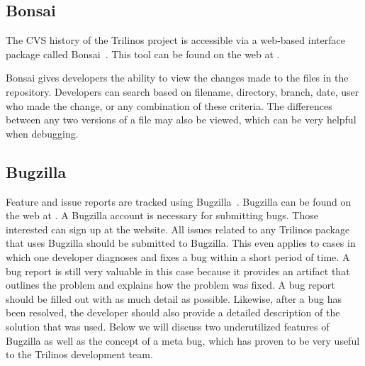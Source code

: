 \documentclass[12pt,relax]{TrilinosDevGuide}
\begin{document}
\subsection{Bonsai}

The CVS history of the Trilinos project is accessible via a
web-based interface package called Bonsai~\cite{Bonsai}.  This tool can be 
found on the web at 
\newline
{}.  

\begin{minipage}[c]{\textwidth}

\begin{minipage}[l]{.6\textwidth}

Bonsai gives developers the ability to view the changes made to the files in 
the repository. Developers can search 
based on filename, directory, branch, date, user who made the 
change, or any combination of these criteria.  The differences between any two 
versions of a file may also be viewed, which can be very helpful when 
debugging.  
\end{minipage}\hfill
{}
\end{minipage}

\subsection{Bugzilla}
\label{subsect:Bugzilla}
Feature and issue reports are tracked using Bugzilla~\cite{Bugzilla}.  
Bugzilla can be found on the web at 
.  
A Bugzilla account is necessary for submitting bugs.  Those interested can 
sign up at the website.  All issues related to any Trilinos package that uses 
Bugzilla should be submitted to Bugzilla.  This even applies to cases in which 
one developer diagnoses and fixes a bug within a short period of time.  A bug 
report is still very valuable in this case because it provides an artifact 
that outlines the problem and explains how the problem was fixed.  A bug 
report should be filled out with as much detail as possible.  Likewise, after 
a bug has been resolved, the developer should also provide a detailed 
description of the solution that was used.  Below we will discuss two 
underutilized features of Bugzilla as well as the concept of a meta bug, which
has proven to be very useful to the Trilinos development team.
\end{document}

